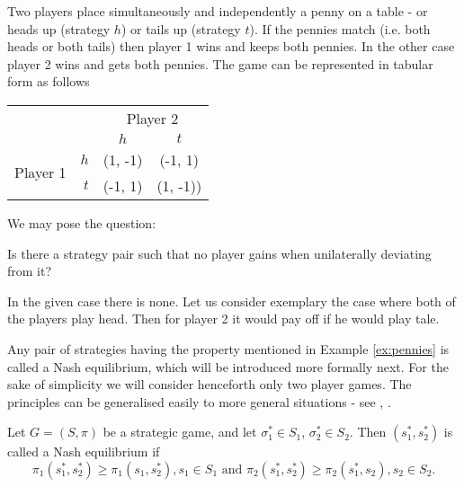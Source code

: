 \begin{example}\label{ex:pennies}
    Two players place simultaneously and independently a penny on a table - or heads up (strategy $h$) or tails up (strategy $t$). If the pennies match (i.e. both heads or both
    tails) then player 1 wins and keeps both pennies. In the other case player 2 wins and gets both pennies. The game can be represented in tabular form as follows
    \newline
    \begin{center}
        \begin{tabular}{c | r | c | c |}
            \multicolumn{2}{c}{} & \multicolumn{2}{c}{Player 2}\\
            \cline{2-4}
            & & $h$ & $t$ \\
            \cline{2-4}
            \multirow{2}{*}{Player 1} & $h$ & (1, -1) & (-1, 1) \\
            \cline{2-4}
            & $t$ & (-1, 1) & (1, -1)) \\
            \cline{2-4}
        \end{tabular}            
    \end{center}
    We may pose the question:
    \begin{addmargin}[75pt]{0pt}
        Is there a strategy pair such that no player gains 
        \newline
        when unilaterally deviating from it?
    \end{addmargin}
    In the given case there is none. Let us consider exemplary the case where both of the players play head. Then for player 2 it would pay off if he would play tale.
\end{example}

Any pair of strategies having the property mentioned in Example \ref{ex:pennies} is called a Nash equilibrium, which will be introduced more formally next. For the sake of
simplicity we will consider henceforth only two player games. The principles can be generalised easily to more general situations - see \cite{webb2007game}, \cite{gonzalez2010introductory}.

\begin{definition}
    Let $G = (S, \pi)$ be a strategic game, and let $\sigma_{1}^{*}\in S_{1}$, $\sigma_{2}^{*}\in S_{2}$. Then $(s_{1}^{*}, s_{2}^{*})$ is called a
    Nash equilibrium if 
    \begin{equation*}
        \pi_{1}(s_{1}^{*}, s_{2}^{*}) \geq \pi_{1}(s_{1}, s_{2}^{*}), s_{1}\in S_{1} \text{ and }
            \pi_{2}(s_{1}^{*}, s_{2}^{*}) \geq \pi_{2}(s_{1}^{*}, s_{2}), s_{2}\in S_{2}.
    \end{equation*}
\end{definition}

